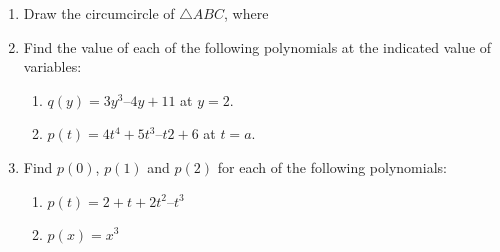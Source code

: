 \renewcommand{\theequation}{\theenumi}
\begin{enumerate}[label=\arabic*.,ref=\thesubsection.\theenumi]
%
\item Draw the circumcircle of $\triangle ABC$, where 
\item Find the value of each of the following polynomials at the indicated value of variables: 
\begin{enumerate}
\item  $q(y) = 3y^3 – 4y + 11$ at $y = 2. $
\item  $p(t) = 4t^4+ 5t^3 – t2 + 6$ at $t = a.$
\end{enumerate}
%
\item Find $p(0)$, $p(1)$ and $p(2)$ for each of the following polynomials: 
\begin{enumerate}
\item  $p(t) = 2 + t + 2t^2 – t^3 $
\item $ p(x) = x^3$
\end{enumerate}

\end{enumerate}
